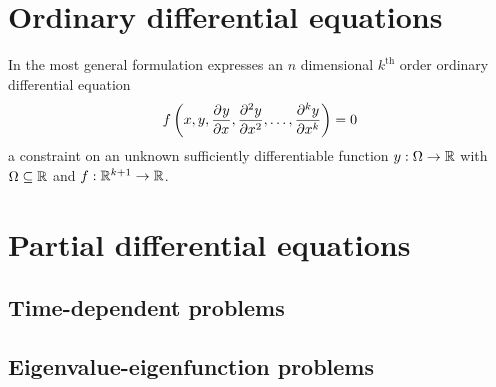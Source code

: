 \section{Ordinary differential equations}

In the most general formulation expresses an $n$ dimensional $k^\text{th}$ order ordinary differential equation 
$$
f\left(x, y, {\pdv[]{y}{x}}, {\pdv[2]{y}{x}}, \dots, {\pdv[k]{y}{x}}\right) = 0
$$
a constraint on an unknown sufficiently differentiable function $y : \Omega \to \mathbb{R}$ with $\Omega \subseteq \mathbb{R}$ and $f: \mathbb{R}^{k+1} \to \mathbb{R}$.


\section{Partial differential equations}

\subsection{Time-dependent problems}

\subsection{Eigenvalue-eigenfunction problems}

\stopchapter
